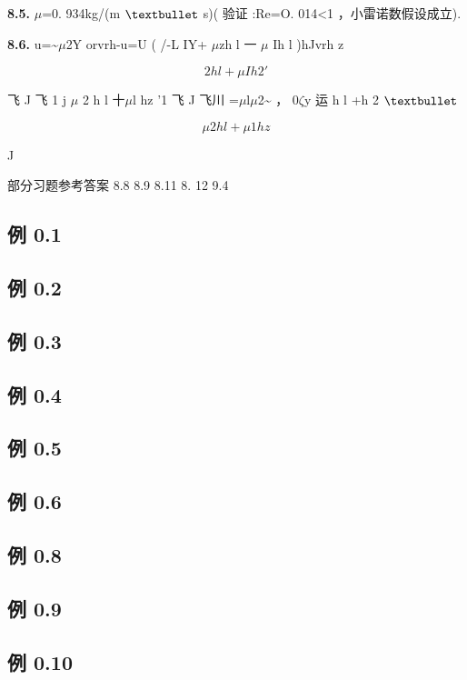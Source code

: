 \noindent\textbf{8.5.} $\mu$=0. 934kg/(m ${\rm •}$ s)( 验证 :Re=O. 014<1 ，小雷诺数假设成立).

\noindent\textbf{8.6.} u=\textasciitilde{}$\mu$2Y orvrh-u=U ( /-L IY+ $\mu$zh l 一 $\mu$ Ih l )hJvrh z

\[2 h l + \mu  Ih 2 '\]

飞 J 飞 1 j $\mu$ 2 h l 十$\mu$l hz '1 飞 J 飞川 =$\mu$l$\mu$2\textasciitilde{} ， 0$\zeta$y 运 h l +h 2 ${\rm •}$

\[\mu  2 h l +\mu 1hz\]

J

部分习题参考答案 8.8 8.9 8.11 8. 12 9.4

\subsection*{例 0.1}

\subsection*{例 0.2}

\subsection*{例 0.3}

\subsection*{例 0.4}

\subsection*{例 0.5}

\subsection*{例 0.6}

\subsection*{例 0.8}

\subsection*{例 0.9}

\subsection*{例 0.10}

